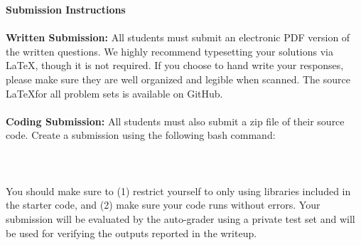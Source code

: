 {\bf Submission Instructions} \\~\\
{\bf Written Submission:}
All students must submit an electronic PDF version of the written questions. We highly recommend typesetting your solutions via \LaTeX, though it is not required. If you choose to hand write your responses, please make sure they are well organized and legible when scanned. The source \LaTeX for all problem sets is available on GitHub.\\~\\
{\bf Coding Submission:}
All students must also submit a zip file of their source code.
Create a submission using the following bash command:\\\\
\small{\zipscript}\\\\ 
You should make sure to (1) restrict yourself to only using libraries included in the starter code, and (2) make sure your code runs without errors.
Your submission will be evaluated by the auto-grader using a private test set and will be used for verifying the outputs reported in the writeup.\\~\\~\\